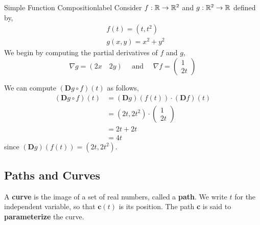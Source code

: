 \begin{ex}{Simple Function Composition}{label}
    Consider $f: \mathbb{R} \rightarrow \mathbb{R}^2$ and $g: \mathbb{R}^2 \rightarrow \mathbb{R}$ defined by,
    \begin{align*}
        &f(t) = (t, t^2) \\
        &g(x, y) = x^2 + y^2
    \end{align*}
    We begin by computing the partial derivatives of $f$ and $g$,
    \[\nabla g=(2 x \quad 2 y) \quad \text{ and } \quad \nabla f=\left(\begin{array}{l}
        1 \\
        2 t
        \end{array}\right)\]

    We can compute $(\mathbf{D} g \circ f)(t)$ as follows,
    \begin{align*}
        (\mathbf{D} g \circ f)(t)&=(\mathbf{D} g)(f(t)) \cdot(\mathbf{D} f)(t) \\
        &=\left(2 t, 2 t^2\right) \cdot\left(\begin{array}{l}
            1 \\
            2 t
            \end{array}\right) \\
        &=2 t+2 t \\
        &=4 t
    \end{align*}
    since $(\mathbf{D} g)(f(t))=\left(2 t, 2 t^2\right)$.
\end{ex}

\subsection{Paths and Curves}
\begin{defn}[Curve]
    \sloppy A \textbf{curve} is the image of a set of real numbers, called a \textbf{path}. We write $t$ for the independent variable, so that $\mathbf{c}(t)$ is its position. The path \textbf{c} is said to \textbf{parameterize} the curve.
\end{defn}

